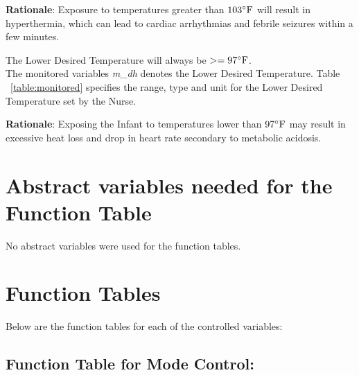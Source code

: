 \documentclass[fontsize=12pt,paper=letter,twoside]{scrartcl}
\begin{document}
\smallskip
\noindent \textbf{Rationale}: Exposure to temperatures greater than $103^{\circ}\mathrm{F}$ will result in hyperthermia, which can lead to cardiac arrhythmias and febrile seizures within a few minutes.

\edescription
{The Lower Desired Temperature will always be $ >= 97^{\circ}\mathrm{F}$.\\}
{The monitored variables \emph{m\_dh} denotes the Lower Desired Temperature. Table ~\ref{table:monitored} specifies the range, type and unit for the Lower Desired Temperature set by the Nurse.}
\label{E5}

\smallskip
\noindent \textbf{Rationale}: Exposing the Infant to temperatures lower than $97^{\circ}\mathrm{F}$ may result in excessive heat loss and drop in heart rate secondary to metabolic acidosis.


\newpage
\section{Abstract variables needed for the Function Table}

No abstract variables were used for the function tables.

\newpage
\section{Function Tables}

Below are the function tables for each of the controlled variables:\\

\subsection{Function Table for Mode Control: }
\end{document}
